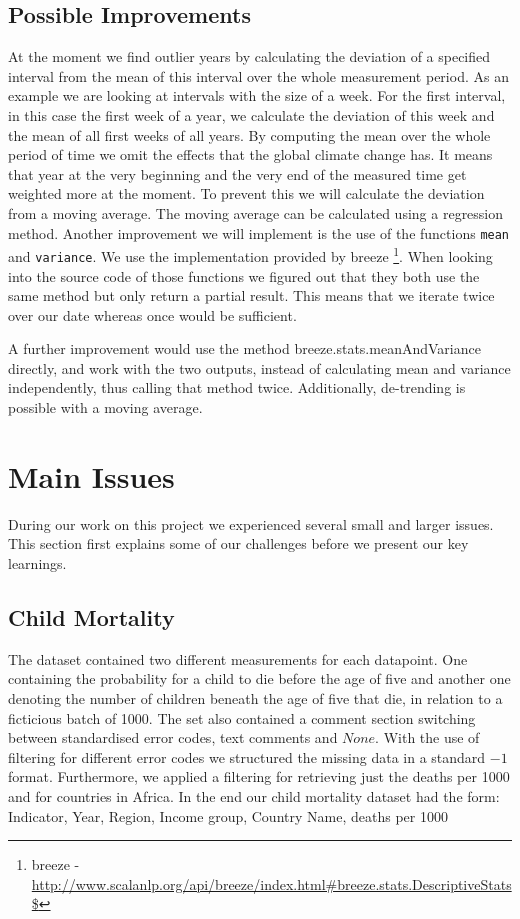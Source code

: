 \documentclass[
10pt, %
a4paper, %
oneside, %
headinclude,footinclude, %
useAMS,
usenatbib
]{mn2e}  %
\begin{document}
\subsection{Possible Improvements}
At the moment we find outlier years by calculating the deviation of a specified interval from the mean of this interval over the whole measurement period. As an example we are looking at intervals with the size of a week. For the first interval, in this case the first week of a year, we calculate the deviation of this week and the mean of all first weeks of all years. By computing the mean over the whole period of time we omit the effects that the global climate change has. It means that year at the very beginning and the very end of the measured time get weighted more at the moment. To prevent this we will calculate the deviation from a moving average. The moving average can be calculated using a regression method.  Another improvement we will implement is the use of the functions \texttt{mean} and \texttt{variance}. We use the implementation provided by breeze \footnote{breeze -  \url{http://www.scalanlp.org/api/breeze/index.html\#breeze.stats.DescriptiveStats\$}}. When looking into the source code of those functions we figured out that they both use the same method but only return a partial result. This means that we iterate twice over our date whereas once would be sufficient.

A further improvement would use the method breeze.stats.meanAndVariance directly, and work with the two outputs, instead of calculating mean and variance independently, thus calling that method twice.
Additionally, de-trending is possible with a moving average.


\section{Main Issues}
\label{sec:issues}
During our work on this project we experienced several small and larger issues. This section first explains some of our challenges before we present our key learnings.

\subsection{Child Mortality}
The dataset contained two different measurements for each datapoint. One containing the probability for a child to die before the age of five and another one denoting the number of children beneath the age of five that die, in relation to a ficticious batch of 1000. The set also contained a comment section switching between standardised error codes, text comments and $None$.  With the use of filtering for different error codes we structured the missing data in a standard $-1$ format. Furthermore, we applied a filtering for retrieving just the deaths per 1000 and for countries in Africa. In the end our child mortality dataset had the form: Indicator, Year, Region, Income group, Country Name, deaths per 1000
\end{document}
